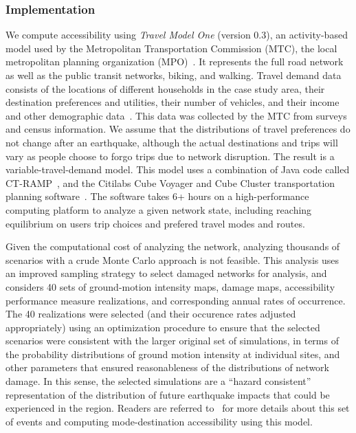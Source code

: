 \subsubsection{Implementation}
We compute accessibility using  \emph{Travel Model One} (version 0.3), an activity-based model used by the Metropolitan Transportation Commission (MTC), the local metropolitan planning organization (MPO)~\cite{erhardt_mtcs_2012}. It represents the full road network as well as the public transit networks, biking, and walking. Travel demand data consists of the locations of different households in the case study area, their destination preferences and utilities, their number of vehicles, and their income and other demographic data~\cite{erhardt_mtcs_2012,ory_personal_2013,waddell_urbansim:_2002}. This data was collected by the MTC from surveys and census information. We assume that the distributions of travel preferences do not change after an earthquake, although the actual destinations and trips will vary as people choose to forgo trips due to network disruption. The result is a variable-travel-demand model. This model uses a combination of Java code called CT-RAMP~\cite{davidson_ct-ramp_2010}, and the Citilabs Cube Voyager and Cube Cluster transportation planning software~\cite{erhardt_mtcs_2012}. The software takes 6+ hours on a high-performance computing platform to analyze a given network state, including reaching equilibrium on users trip choices and prefered travel modes and routes.

Given the computational cost of analyzing the network, analyzing thousands of scenarios with a crude Monte Carlo approach is not feasible. This analysis uses an improved sampling strategy to select damaged networks for analysis, and considers 40 sets of ground-motion intensity maps, damage maps, accessibility performance measure realizations, and corresponding annual rates of occurrence. The 40 realizations were selected (and their occurence rates adjusted appropriately) using an optimization procedure to ensure that the selected scenarios were consistent with the larger original set of simulations, in terms of the probability distributions of ground motion intensity at individual sites, and other parameters that ensured reasonableness of the distributions of network damage. In this sense, the selected simulations are a ``hazard consistent'' representation of the distribution of future earthquake impacts that could be experienced in the region. Readers are referred to~\cite{miller_seismic_2014} for more details about this set of events and computing mode-destination accessibility using this model. 

